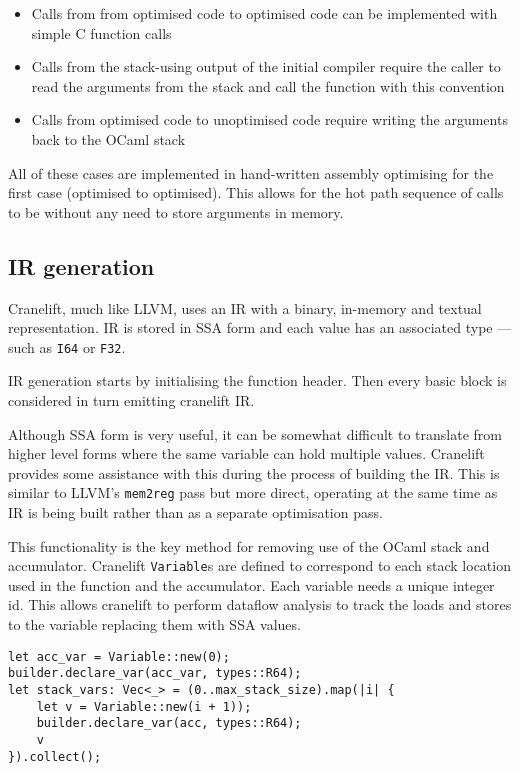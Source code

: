 \begin{itemize}
      \item Calls from from optimised code to optimised code can be implemented with simple C
            function calls
      \item Calls from the stack-using output of the initial compiler require the caller to read
            the arguments
            from the stack and call the function with this convention
      \item Calls from optimised code to unoptimised
            code require writing the arguments back to the OCaml stack
\end{itemize}

All of these cases are implemented in hand-written assembly optimising for the first case
(optimised to optimised). This allows for the hot path sequence of calls to be without any need to
store arguments in memory.

\subsection{IR generation} \label{opt-irgen}

Cranelift, much like LLVM, uses an IR with a binary, in-memory and textual representation. IR is
stored in SSA form and each value has an associated type --- such as \texttt{I64} or \texttt{F32}.

IR generation starts by initialising the function header. Then every basic block is considered in
turn emitting cranelift IR.

Although SSA form is very useful, it can be somewhat difficult to translate from higher level forms
where the same variable can hold multiple values. Cranelift provides some assistance with this
during the process of building the IR.	This is similar to LLVM's \texttt{mem2reg} pass but more
direct, operating at the same time as IR is being built rather than as a separate optimisation
pass.

This functionality is the key method for removing use of the OCaml stack and accumulator. Cranelift
\texttt{Variable}s are defined to correspond to each stack location used in the function and the
accumulator.
Each variable needs a unique integer id. This allows cranelift to perform dataflow analysis to
track the loads and stores to the variable replacing them with SSA values.

\begin{verbatim}
let acc_var = Variable::new(0);
builder.declare_var(acc_var, types::R64);
let stack_vars: Vec<_> = (0..max_stack_size).map(|i| {
    let v = Variable::new(i + 1));
    builder.declare_var(acc, types::R64);
    v
}).collect();
\end{verbatim}

